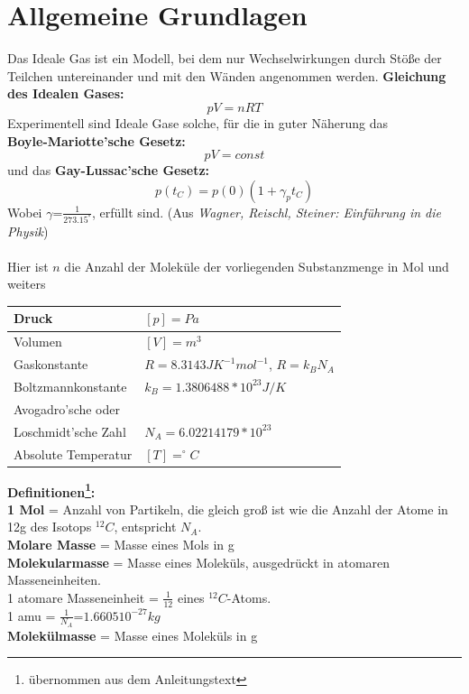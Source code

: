 \documentclass{article}
\begin{document}
\section{Allgemeine Grundlagen}
Das Ideale Gas ist ein Modell, bei dem nur Wechselwirkungen durch Stöße der Teilchen untereinander und mit den Wänden angenommen werden.
\textbf{Gleichung des Idealen Gases:}
\begin{equation}
\label{gasgleichung}
pV=nRT
\end{equation}
Experimentell sind Ideale Gase solche, für die in guter Näherung das\\ \textbf{Boyle-Mariotte'sche Gesetz:}
\begin{equation}
\label{boyle-mariotte}
pV=const
\end{equation}
und das \textbf{Gay-Lussac'sche Gesetz:}
\begin{equation}
\label{gay-lussac}
p(t_C)=p(0)(1+\gamma_p t_C)
\end{equation}
Wobei $\gamma$=$\frac{1}{273.15^\circ}$, erfüllt sind. (Aus \textit{Wagner, Reischl, Steiner: Einführung in die Physik})\\
\\
Hier ist $n$ die Anzahl der Moleküle der vorliegenden Substanzmenge in Mol und weiters
\begin{flushleft}
\begin{tabular}{|l|l|}
\hline Druck & $[p]=Pa$\\
\hline Volumen & $[V]=m^3$\\
\hline Gaskonstante & $R=8.3143 J K^{-1} mol^{-1}$, $R=k_B N_A$\\
\hline Boltzmannkonstante & $k_B=1.3806488*10^{23}J/K$\\
\hline Avogadro'sche oder &\\
Loschmidt'sche Zahl & $N_A=6.02214179*10^{23}$\\
\hline Absolute Temperatur & $[T]=^\circ C$\\
\hline
\end{tabular}
\end{flushleft}
\textbf{Definitionen\footnote{übernommen aus dem Anleitungstext}:}\\
\textbf{1 Mol} = Anzahl von Partikeln, die gleich groß ist wie die Anzahl der Atome in 12g des Isotops $^{12}C$, entspricht $N_A$. \\
\textbf{Molare Masse} = Masse eines Mols in g\\
\textbf{Molekularmasse} = Masse eines Moleküls, ausgedrückt in atomaren Masseneinheiten. \\
1 atomare Masseneinheit = $\frac{1}{12}$ eines $^{12}C$-Atoms.\\
1 amu = $\frac{1}{N_A}$=$1.6605 10^{-27}kg$\\
\textbf{Molekülmasse} = Masse eines Moleküls in g\\
\newpage
\end{document}
